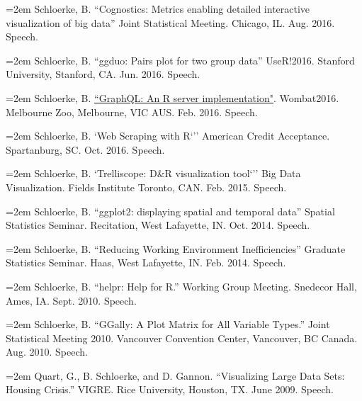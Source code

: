 \documentclass[oneside]{article}
\begin{document}
    \hangindent=2em
    Schloerke, B. ``Cognostics: Metrics enabling detailed interactive visualization of big data'' Joint Statistical Meeting. Chicago, IL. Aug. 2016. Speech.

    \hangindent=2em
    Schloerke, B. ``ggduo: Pairs plot for two group data'' UseR!2016. Stanford University, Stanford, CA. Jun. 2016. Speech.

    \hangindent=2em
    Schloerke, B. \href{http://wombat2016.org/abstracts/barret.html}{``GraphQL: An R server implementation"}. Wombat2016. Melbourne Zoo, Melbourne, VIC AUS. Feb. 2016. Speech.

    \hangindent=2em
    Schloerke, B. `Web Scraping with R`'' American Credit Acceptance. Spartanburg, SC. Oct. 2016. Speech.

    \hangindent=2em
    Schloerke, B. `Trelliscope: D\&R visualization tool`'' Big Data Visualization. Fields Institute Toronto, CAN. Feb. 2015. Speech.

    \hangindent=2em
    Schloerke, B. ``ggplot2: displaying spatial and temporal data'' Spatial Statistics Seminar. Recitation, West Lafayette, IN. Oct. 2014. Speech.

    \hangindent=2em
    Schloerke, B. ``Reducing Working Environment Inefficiencies'' Graduate Statistics Seminar. Haas, West Lafayette, IN. Feb. 2014. Speech.

    \hangindent=2em
    Schloerke, B. ``helpr: Help for R.'' Working Group Meeting. Snedecor Hall, Ames, IA. Sept. 2010. Speech.

    \hangindent=2em
    Schloerke, B. ``GGally: A Plot Matrix for All Variable Types.'' Joint Statistical Meeting 2010. Vancouver  Convention Center, Vancouver, BC Canada. Aug. 2010. Speech.


    \hangindent=2em
    Quart, G., B. Schloerke, and D. Gannon. ``Visualizing Large Data Sets: Housing Crisis.'' VIGRE. Rice  University, Houston, TX. June 2009. Speech.
\end{document}
